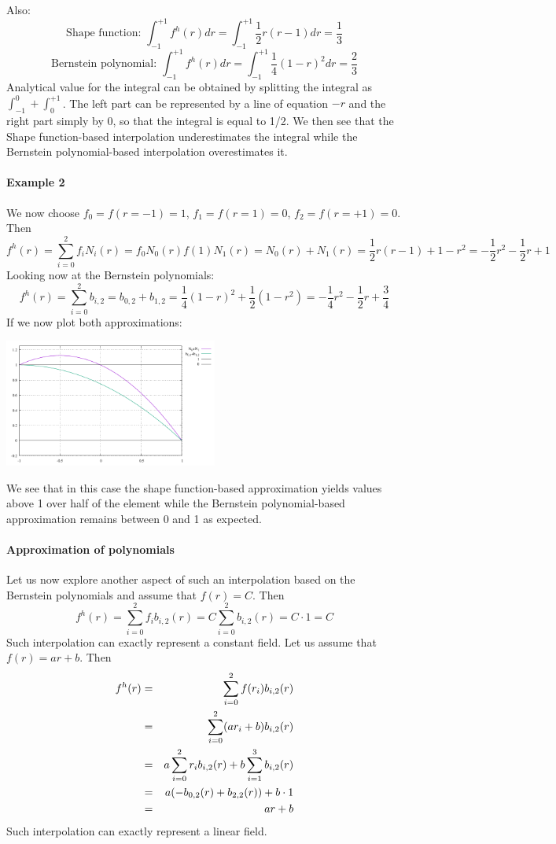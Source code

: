Also:
\[
\text{Shape function: } \int_{-1}^{+1} f^h(r)dr = \int_{-1}^{+1} \frac{1}{2}r(r-1) dr = \frac{1}{3}  
\]
\[
\text{Bernstein polynomial: } \int_{-1}^{+1} f^h(r)dr =  \int_{-1}^{+1} \frac{1}{4}(1-r)^2 dr=  \frac{2}{3}  
\]
Analytical value for the integral can be obtained by splitting the integral as $\int_{-1}^0 + \int_0^{+1}$.
The left part can be represented by a line of equation $-r$ and the right part simply by 0, so that the 
integral is equal to 1/2. We then see that the Shape function-based interpolation underestimates
the integral while the Bernstein polynomial-based interpolation overestimates it.


\paragraph{Example 2}

We now choose $f_0=f(r=-1)=1$, $f_1=f(r=1)=0$, $f_2=f(r=+1)=0$. Then 
\[
f^h(r) = \sum_{i=0}^2 f_i N_i(r) = f_0 N_0(r) f(1) N_1(r) 
= N_0(r) + N_1(r) = \frac{1}{2}r(r-1) + 1-r^2 = -\frac{1}{2}r^2 -\frac{1}{2}r +1  
\]
Looking now at the Bernstein polynomials:
\[
f^h(r) = \sum_{i=0}^2 b_{i,2} = b_{0,2} + b_{1,2} = \frac{1}{4}(1-r)^2 + \frac{1}{2}(1-r^2)
= -\frac{1}{4}r^2-\frac{1}{2}r+\frac{3}{4}
\]
If we now plot both approximations:
\begin{center}
\includegraphics[width=7cm]{images/bernstein/N2__.pdf}
\end{center}
We see that in this case the shape function-based approximation yields values 
above 1 over half of the element while the Bernstein polynomial-based 
approximation remains between 0 and 1 as expected.

\paragraph{Approximation of polynomials}
Let us now explore another aspect of such an interpolation based on the Bernstein polynomials
and assume that $f(r)=C$. Then 
\[
f^h(r) = \sum_{i=0}^2 f_i b_{i,2}(r) = C \sum_{i=0}^2 b_{i,2}(r) = C \cdot 1 = C
\]
Such interpolation can exactly represent a constant field. 
Let us assume that $f(r)=ar+b$. Then 
\begin{eqnarray}
f^h(r) 
&=& \sum_{i=0}^2 f(r_i) b_{i,2}(r)  \nonumber\\
&=& \sum_{i=0}^2 (ar_i+b) b_{i,2}(r) \nonumber\\
&=& a\sum_{i=0}^2 r_i b_{i,2}(r) + b \sum_{i=1}^3 b_{i,2}(r) \nonumber\\
&=& a (-b_{0,2}(r)+b_{2,2}(r)) + b \cdot 1 \nonumber\\
&=& ar+b 
\end{eqnarray}
Such interpolation can exactly represent a linear field. 

